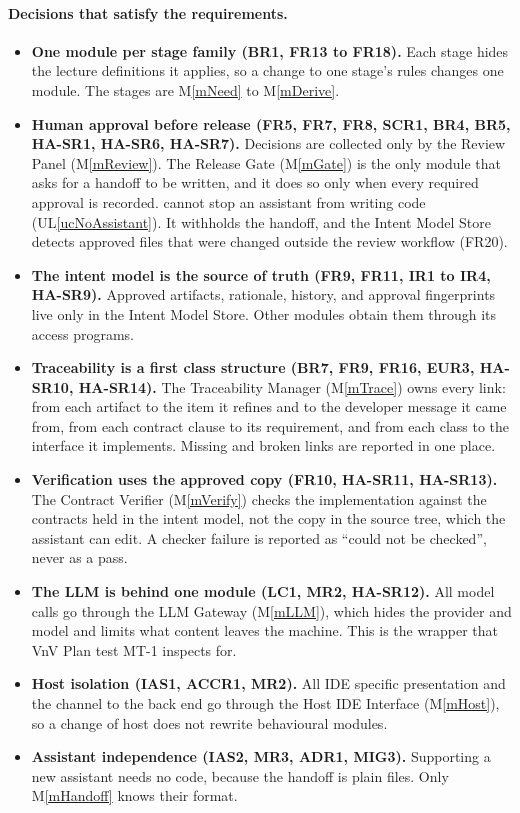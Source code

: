 \documentclass[12pt, titlepage]{article}
\newcommand{\uref}[1]{UL\ref{#1}}
\newcommand{\mref}[1]{M\ref{#1}}
\begin{document}
\paragraph{Decisions that satisfy the requirements.}
\begin{itemize}
  \item \textbf{One module per stage family (BR1, FR13 to FR18).} Each stage
  hides the lecture definitions it applies, so a change to one stage's rules
  changes one module. The stages are \mref{mNeed} to \mref{mDerive}.
  \item \textbf{Human approval before release (FR5, FR7, FR8, SCR1, BR4, BR5,
  HA-SR1, HA-SR6, HA-SR7).} Decisions are collected only by the Review Panel
  (\mref{mReview}). The Release Gate (\mref{mGate}) is the only module that
  asks for a handoff to be written, and it does so only when every required
  approval is recorded. \progname{} cannot stop an assistant from writing
  code (\uref{ucNoAssistant}). It withholds the handoff, and the Intent Model
  Store detects approved files that were changed outside the review workflow
  (FR20).
  \item \textbf{The intent model is the source of truth (FR9, FR11, IR1 to IR4,
  HA-SR9).} Approved artifacts, rationale, history, and approval fingerprints
  live only in the Intent Model Store. Other modules obtain them through its
  access programs.
  \item \textbf{Traceability is a first class structure (BR7, FR9, FR16, EUR3,
  HA-SR10, HA-SR14).} The Traceability Manager (\mref{mTrace}) owns every link:
  from each artifact to the item it refines and to the developer message it
  came from, from each contract clause to its requirement, and from each class
  to the interface it implements. Missing and broken links are reported in one
  place.
  \item \textbf{Verification uses the approved copy (FR10, HA-SR11,
  HA-SR13).} The Contract Verifier (\mref{mVerify}) checks the implementation
  against the contracts held in the intent model, not the copy in the source
  tree, which the assistant can edit. A checker failure is reported as
  ``could not be checked'', never as a pass.
  \item \textbf{The LLM is behind one module (LC1, MR2, HA-SR12).} All
  model calls go through the LLM Gateway (\mref{mLLM}), which hides the
  provider and model and limits what content leaves the machine. This is the
  wrapper that VnV Plan test MT-1 inspects for.
  \item \textbf{Host isolation (IAS1, ACCR1, MR2).} All IDE specific
  presentation and the channel to the back end go through the Host IDE
  Interface (\mref{mHost}), so a change of host does not rewrite behavioural
  modules.
  \item \textbf{Assistant independence (IAS2, MR3, ADR1, MIG3).} Supporting a new
  assistant needs no code, because the handoff is plain files. Only
  \mref{mHandoff} knows their format.
\end{itemize}
\end{document}
